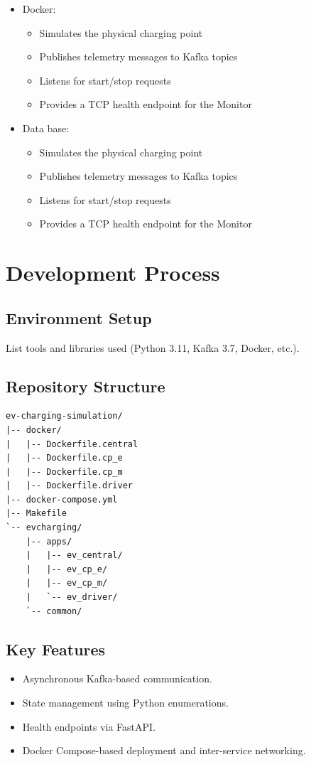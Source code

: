 \documentclass[12pt,a4paper]{article}
\begin{document}
\begin{itemize}
\begin{itemize}
        \end{itemize}
    \item Docker:
        \begin{itemize}
            \item Simulates the physical charging point
            \item Publishes telemetry messages to Kafka topics
            \item Listens for start/stop requests
            \item Provides a TCP health endpoint for the Monitor
        \end{itemize}
    \item Data base:
        \begin{itemize}
            \item Simulates the physical charging point
            \item Publishes telemetry messages to Kafka topics
            \item Listens for start/stop requests
            \item Provides a TCP health endpoint for the Monitor
        \end{itemize}
\end{itemize}


\section{Development Process}

\subsection{Environment Setup}
List tools and libraries used (Python 3.11, Kafka 3.7, Docker, etc.).

\subsection{Repository Structure}
\begin{lstlisting}
ev-charging-simulation/
|-- docker/
|   |-- Dockerfile.central
|   |-- Dockerfile.cp_e
|   |-- Dockerfile.cp_m
|   |-- Dockerfile.driver
|-- docker-compose.yml
|-- Makefile
`-- evcharging/
    |-- apps/
    |   |-- ev_central/
    |   |-- ev_cp_e/
    |   |-- ev_cp_m/
    |   `-- ev_driver/
    `-- common/
\end{lstlisting}

\subsection{Key Features}
\begin{itemize}
    \item Asynchronous Kafka-based communication.
    \item State management using Python enumerations.
    \item Health endpoints via FastAPI.
    \item Docker Compose-based deployment and inter-service networking.
\end{itemize}
\end{document}
